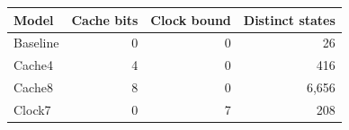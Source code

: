 \begin{tabular}{@{}lrrr@{}}\toprule
Model & Cache bits & Clock bound & Distinct states \\\midrule
Baseline & 0 & 0 & 26 \\
Cache4 & 4 & 0 & 416 \\
Cache8 & 8 & 0 & 6,656 \\
Clock7 & 0 & 7 & 208 \\
\bottomrule\end{tabular}
